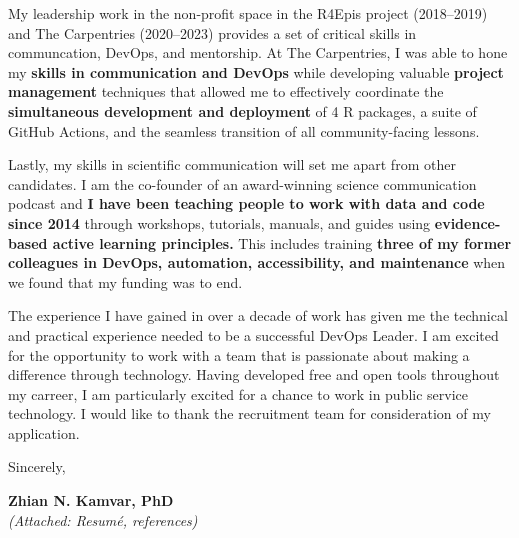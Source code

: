 


\vspace{2ex}


My leadership work in the non-profit space in the R4Epis project (2018--2019) and The Carpentries (2020--2023) provides a set of critical skills in communcation, DevOps, and mentorship.
At The Carpentries, I was able to hone my \textbf{skills in communication and DevOps} while developing valuable \textbf{project management} techniques that allowed me to effectively coordinate the \textbf{simultaneous development and deployment} of 4 R packages, a suite of GitHub Actions, and the seamless transition of all community-facing lessons. 

\vspace{2ex}

Lastly, my skills in scientific communication will set me apart from other candidates. 
I am the co-founder of an award-winning science communication podcast and
\textbf{I have been teaching people to work with data and code since 2014} through workshops, tutorials, manuals, and guides using \textbf{evidence-based active learning principles.} 
This includes training \textbf{three of my former colleagues in DevOps, automation, accessibility, and maintenance} when we found that my funding was to end.

\vspace{2ex}
The experience I have gained in over a decade of work has given me the technical and practical experience needed to be a successful DevOps Leader. 
I am excited for the opportunity to work with a team that is passionate about making a difference through technology.
Having developed free and open tools throughout my carreer, I am particularly excited for a chance to work in public service technology. 
I would like to thank the recruitment team for consideration of my application.

\vspace{3ex}

Sincerely,

\vspace{4ex}

\textbf{Zhian N. Kamvar, PhD}\\
{\footnotesize \textit{(Attached: Resum\'{e}, references)}}

\clearpage



